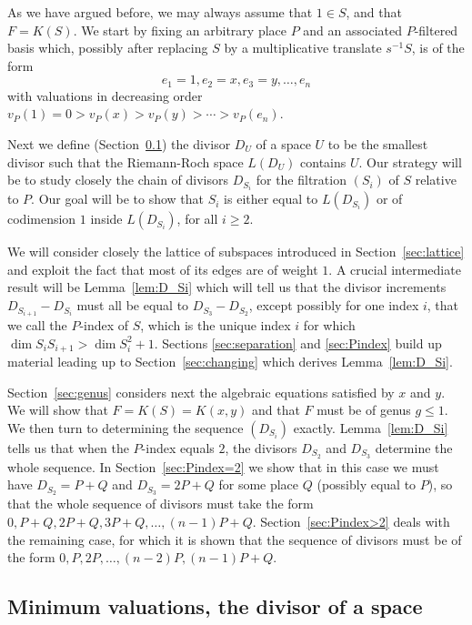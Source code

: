 \documentclass{article}
\theoremstyle{plain}
\theoremstyle{definition}
\theoremstyle{remark}
\renewcommand{\geq}{\geqslant}
\renewcommand{\leq}{\leqslant}
\begin{document}
As we have argued before, we may always assume that $1\in S$, and that
$F=K(S)$. We start by fixing an arbitrary place $P$ and an associated
$P$-filtered basis which, possibly after replacing $S$ by a
multiplicative translate $s^{-1}S$, is of the form
$$e_1=1,e_2=x,e_3=y,\ldots, e_n$$
with valuations in decreasing order $v_P(1)=0>v_P(x)>v_P(y)>\cdots
>v_P(e_n)$.

Next we define (Section~\ref{sec:divisor}) the divisor $D_U$ of a
space $U$ to be the smallest {divisor such that the}
Riemann-Roch space {$L(D_U)$} contains $U$. Our
strategy will be to study closely the chain of divisors $D_{S_i}$ for
the filtration $(S_i)$ of $S$ relative to $P$. Our goal will be to
show that $S_i$ is either equal to $L(D_{S_i})$ or of codimension $1$
inside $L(D_{S_i})$, for all $i\geq 2$.

We will consider closely the lattice of subspaces introduced in
Section~\ref{sec:lattice} and exploit the fact that most of its edges are of
weight $1$. A crucial intermediate result will be Lemma~\ref{lem:D_Si}
which will tell us that the divisor increments $D_{S_{i+1}}-D_{S_i}$ 
must all be equal to $D_{S_3}-D_{S_2}$, except possibly for one index $i$, that we
call the $P$-index of $S$, which is the
unique index $i$ for which $\dim S_iS_{i+1}>\dim S_i^2+1$.
Sections 
\ref{sec:separation} and \ref{sec:Pindex} build up material leading up
to Section~\ref{sec:changing} which derives Lemma~\ref{lem:D_Si}.

Section~\ref{sec:genus} considers next the algebraic equations
satisfied by $x$ and $y$. We will show that $F=K(S)=K(x,y)$ and that
$F$ must be of genus $g\leq 1$. We then turn to determining the
sequence $(D_{S_i})$ exactly. Lemma~\ref{lem:D_Si} tells us that when
the $P$-index equals $2$, the divisors $D_{S_2}$ and $D_{S_3}$
determine the whole sequence. In Section~\ref{sec:Pindex=2} we show
that in this case we must have $D_{S_2}=P+Q$ and $D_{S_3}=2P+Q$ for
some place $Q$ (possibly equal to $P$), so that the
whole sequence of divisors must take the form
$0,P+Q,2P+Q,3P+Q,\ldots ,(n-1)P+Q$.  Section~\ref{sec:Pindex>2} deals
with the remaining case, for which it is shown that the sequence of
divisors must be of the form $0,P,2P,\ldots ,(n-2)P,(n-1)P+Q$.


\subsection{Minimum valuations, the divisor of a space}
\label{sec:divisor}
\end{document}
